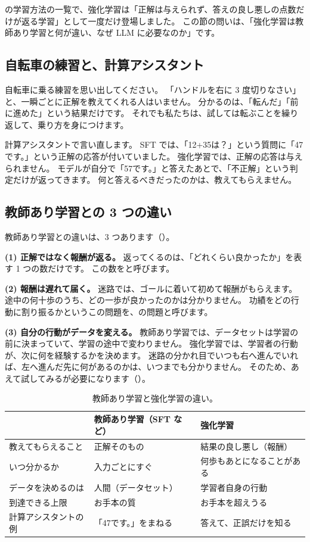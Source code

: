 の学習方法の一覧で、強化学習は「正解は与えられず、答えの良し悪しの点数だけが返る学習」として一度だけ登場しました。
この節の問いは、「強化学習は教師あり学習と何が違い、なぜ LLM に必要なのか」です。

\subsection*{自転車の練習と、計算アシスタント}

自転車に乗る練習を思い出してください。
「ハンドルを右に 3 度切りなさい」と、一瞬ごとに正解を教えてくれる人はいません。
分かるのは、「転んだ」「前に進めた」という結果だけです。
それでも私たちは、試しては転ぶことを繰り返して、乗り方を身につけます。

計算アシスタントで言い直します。
SFT では、「12+35は？」という質問に「47です。」という正解の応答が付いていました。
強化学習では、正解の応答は与えられません。
モデルが自分で「57です。」と答えたあとで、「不正解」という判定だけが返ってきます。
何と答えるべきだったのかは、教えてもらえません。

\subsection*{教師あり学習との 3 つの違い}

教師あり学習との違いは、3 つあります（）。

\textbf{(1) 正解ではなく報酬が返る。}
返ってくるのは、「どれくらい良かったか」を表す 1 つの数だけです。
この数をと呼びます。

\textbf{(2) 報酬は遅れて届く。}
迷路では、ゴールに着いて初めて報酬がもらえます。
途中の何十歩のうち、どの一歩が良かったのかは分かりません。
功績をどの行動に割り振るかというこの問題を、の問題と呼びます。

\textbf{(3) 自分の行動がデータを変える。}
教師あり学習では、データセットは学習の前に決まっていて、学習の途中で変わりません。
強化学習では、学習者の行動が、次に何を経験するかを決めます。
迷路の分かれ目でいつも右へ進んでいれば、左へ進んだ先に何があるのかは、いつまでも分かりません。
そのため、あえて試してみるが必要になります（）。

\begin{table}[tbp]
\centering
\caption{教師あり学習と強化学習の違い。}
\label{tab:rlb-sl-vs-rl}
\small
\begin{tabular}{lll}
\toprule
 & 教師あり学習（SFT など） & 強化学習 \\
\midrule
教えてもらえること & 正解そのもの & 結果の良し悪し（報酬） \\
いつ分かるか & 入力ごとにすぐ & 何歩もあとになることがある \\
データを決めるのは & 人間（データセット） & 学習者自身の行動 \\
到達できる上限 & お手本の質 & お手本を超えうる \\
計算アシスタントの例 & 「47です。」をまねる & 答えて、正誤だけを知る \\
\bottomrule
\end{tabular}
\end{table}

